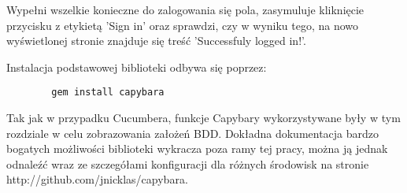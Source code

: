       
      
      Wypełni wszelkie konieczne do zalogowania się pola, zasymuluje kliknięcie przycisku z etykietą 'Sign in' oraz sprawdzi, czy w wyniku tego, na nowo wyświetlonej stronie znajduje się treść 'Successfuly logged in!'.
      
      Instalacja podstawowej biblioteki odbywa się poprzez:
      
      \begin{verbatim}
        gem install capybara
      \end{verbatim}
      
      Tak jak w przypadku Cucumbera, funkcje Capybary wykorzystywane były w tym rozdziale w celu zobrazowania założeń BDD. Dokładna dokumentacja bardzo bogatych możliwości biblioteki wykracza poza ramy tej pracy, można ją jednak odnaleźć wraz ze szczegółami konfiguracji dla różnych środowisk na stronie http://github.com/jnicklas/capybara.
      